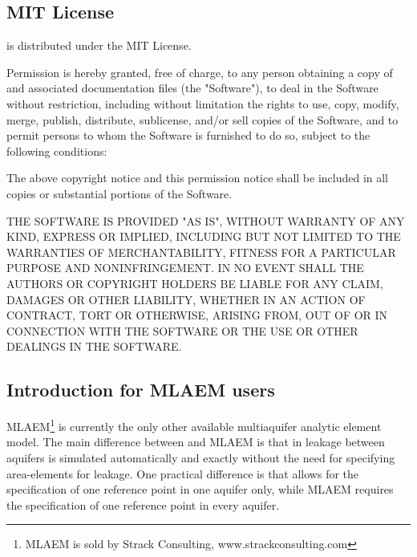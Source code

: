 \documentclass [10pt,letterpaper] {article}
\begin{document}
\subsection{MIT License}

\Timsp is distributed under the MIT License.

Permission is hereby granted, free of charge, to any person obtaining a copy
of \Timsp and associated documentation files (the "Software"), to deal
in the Software without restriction, including without limitation the rights
to use, copy, modify, merge, publish, distribute, sublicense, and/or sell
copies of the Software, and to permit persons to whom the Software is
furnished to do so, subject to the following conditions:

The above copyright notice and this permission notice shall be included in
all copies or substantial portions of the Software.

THE SOFTWARE IS PROVIDED "AS IS", WITHOUT WARRANTY OF ANY KIND, EXPRESS OR
IMPLIED, INCLUDING BUT NOT LIMITED TO THE WARRANTIES OF MERCHANTABILITY,
FITNESS FOR A PARTICULAR PURPOSE AND NONINFRINGEMENT. IN NO EVENT SHALL THE
AUTHORS OR COPYRIGHT HOLDERS BE LIABLE FOR ANY CLAIM, DAMAGES OR OTHER
LIABILITY, WHETHER IN AN ACTION OF CONTRACT, TORT OR OTHERWISE, ARISING FROM,
OUT OF OR IN CONNECTION WITH THE SOFTWARE OR THE USE OR OTHER DEALINGS IN
THE SOFTWARE.

\subsection{Introduction for MLAEM users}
MLAEM\footnote{MLAEM is sold by Strack Consulting, www.strackconsulting.com} is
currently the only other available multiaquifer analytic element model. The
main difference between \Timsp and MLAEM is that in \Timsp leakage between aquifers
is simulated automatically and exactly without the need for specifying
area-elements for leakage. One practical difference is that \Timsp allows for
the specification of one reference point in one aquifer only, while MLAEM
requires the specification of one reference point in every aquifer.
\end{document}
